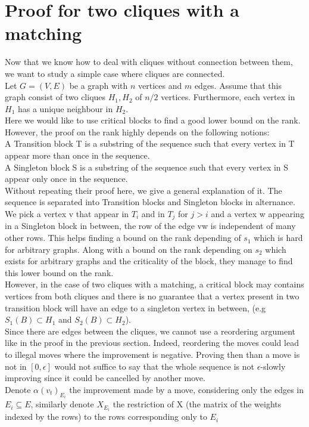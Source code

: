 \section{Proof for two cliques with a matching}
Now that we know how to deal with cliques without connection between them, we want to study a simple case where cliques are connected. \\
Let $G = (V,E)$ be a graph with $n$ vertices and $m$ edges. Assume that this graph consist of two cliques $H_1, H_2$ of $n/2$ vertices. Furthermore, each vertex in $H_1$ has a unique neighbour in $H_2$. \\
Here we would like to use critical blocks to find a good lower bound on the rank. However, the proof on the rank \cite{angel2016local} highly depends on the following notions:\\
A Transition block T is a substring of the sequence such that every vertex in T appear more than once in the sequence. \\
A Singleton block S is a substring of the sequence  such that every vertex in S appear only once in the sequence. \\
Without repeating their proof here, we give a general explanation of it. The sequence is separated into Transition blocks and Singleton blocks in alternance. We pick a vertex v that appear in $T_i$ and in $T_j$ for $ j > i$ and a vertex w appearing in a Singleton block in between, the row of the edge vw is independent of many other rows. This helps finding a bound on the rank depending of $s_1$ which is hard for arbitrary graphs. Along with a bound on the rank depending on $s_2$ which exists for arbitrary graphs and the criticality of the block, they manage to find this lower bound on the rank.\\
However, in the case of two cliques with a matching, a critical block may contains vertices from both cliques and there is no guarantee that a vertex present in two transition block will have an edge to a singleton vertex in between, (e.g $S_1(B) \subset H_1$ and $S_2(B) \subset H_2$).\\ 
Since there are edges between the cliques, we cannot use a reordering argument like in the proof in the previous section. Indeed, reordering the moves could lead to illegal moves where the improvement is negative. Proving then than a move is not in $[0, \epsilon]$ would not suffice to say that the whole sequence is not $\epsilon$-slowly improving since it could be cancelled by another move.\\
Denote $\alpha(v_t)_{E_i}$ the improvement made by a move, considering only the edges in $E_i \subseteq E$, similarly denote $X_{E_i}$ the restriction of X (the matrix of the weights indexed by the rows) to the rows corresponding only to $E_i$ 

